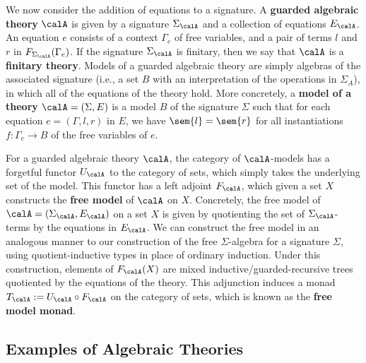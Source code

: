 \documentclass[acmsmall,screen,review,anonymous]{acmart}
\theoremstyle{remark}
\begin{document}
We now consider the addition of equations to a signature.
A \textbf{guarded algebraic theory} $\calA$ is given by a signature
$\Sigma_\calA$ and a collection of equations $E_\calA$. An equation
$e$ consists of a context $\Gamma_e$ of free variables, and a pair of terms
$l$ and $r$ in $F_{\Sigma_\calA}(\Gamma_e)$.
%
If the signature $\Sigma_\calA$ is finitary, then we say that $\calA$ is a
\textbf{finitary theory}.
%
Models of a guarded algebraic theory are simply algebras of the associated
signature (i.e., a set $B$ with an interpretation of the operations in
$\Sigma_A$), in which all of the equations of the theory hold. More concretely,
a \textbf{model of a theory} $\calA = (\Sigma, E)$ is a model $B$ of the
signature $\Sigma$ such that for each equation $e = (\Gamma, l , r)$ in $E$, we have
$\sem{l} = \sem{r}$ for all instantiations $f : \Gamma_e \to B$ of the free
variables of $e$.

For a guarded algebraic theory $\calA$, the category of $\calA$-models has a
forgetful functor $U_\calA$ to the category of sets, which simply takes the
underlying set of the model. This functor has a left adjoint $F_\calA$, which
given a set $X$ constructs the \textbf{free model} of $\calA$ on $X$. Concretely,
the free model of $\calA = (\Sigma_\calA, E_\calA)$ on a set $X$ is given by
quotienting the set of $\Sigma_\calA$-terms by the equations in $E_\calA$.
%
We can construct the free model in an analogous manner to our construction of
the free $\Sigma$-algebra for a signature $\Sigma$, using quotient-inductive
types in place of ordinary induction.
%
Under this construction, elements of $F_\calA(X)$ are mixed
inductive/guarded-recursive trees quotiented by the equations of the theory.
%
This adjunction induces a monad $T_\calA := U_\calA \circ F_\calA$ on the
category of sets, which is known as the \textbf{free model monad}.


\subsection{Examples of Algebraic Theories}\label{sec:alg-theory-examples}
\end{document}
